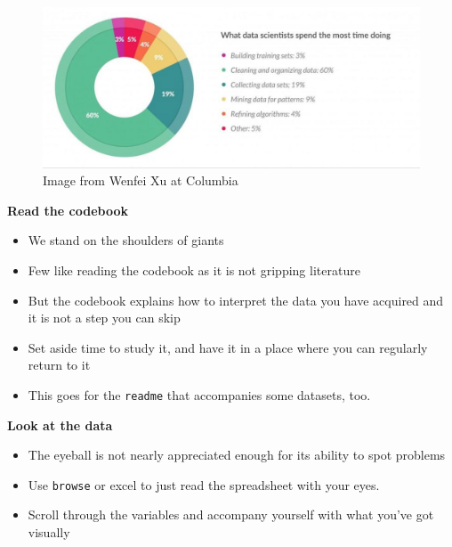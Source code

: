 \documentclass[notes=show]{beamer}
\begin{document}
\begin{frame}[plain]

\begin{figure}
\includegraphics[scale=0.1]{./lecture_includes/time.png}
\caption{Image from Wenfei Xu at Columbia}
\end{figure}

\end{frame}

\begin{frame}[plain]
\begin{center}
\textbf{Read the codebook}
\end{center}

\begin{itemize}
\item We stand on the shoulders of giants
\item Few like reading the codebook as it is not gripping literature 
\item But the codebook explains how to interpret the data you have acquired and it is not a step you can skip
\item Set aside time to study it, and have it in a place where you can regularly return to it
\item This goes for the \texttt{readme} that accompanies some datasets, too. 
\end{itemize}

\end{frame}

\begin{frame}[plain]
\begin{center}
\textbf{Look at the data}
\end{center}

\begin{itemize}
\item The eyeball is not nearly appreciated enough for its ability to spot problems
\item Use \texttt{browse} or excel to just read the spreadsheet with your eyes.
\item Scroll through the variables and accompany yourself with what you've got visually
\end{itemize}

\end{frame}
\end{document}

